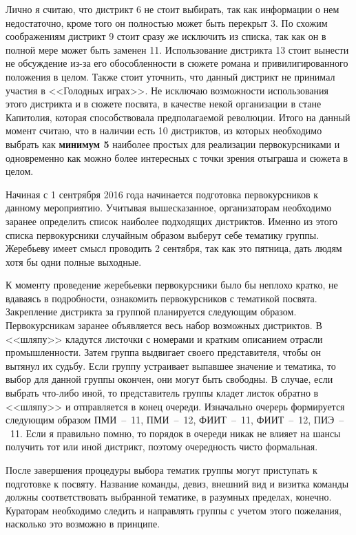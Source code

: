 \documentclass[a4paper, 14pt]{extarticle}
\begin{document}
\par Лично я считаю, что дистрикт 6 не стоит выбирать, так как информации о нем недостаточно, кроме того он полностью может быть перекрыт 3. По схожим соображениям дистрикт 9 стоит сразу же исключить из списка, так как он в полной мере может быть заменен 11. Использование дистрикта 13 стоит вынести не обсуждение из-за его обособленности в сюжете романа и привилигированного положения в целом. Также стоит уточнить, что данный дистрикт не принимал участия в <<Голодных играх>>. Не исключаю возможности использования этого дистрикта и в сюжете посвята, в качестве некой организации в стане Капитолия, которая способствовала предполагаемой революции. Итого на данный момент считаю, что в наличии есть 10 дистриктов, из которых необходимо выбрать как \textbf{минимум 5} наиболее простых для реализации первокурсниками и одновременно как можно более интересных с точки зрения отыграша и сюжета в целом.

\par Начиная с 1 сентрября 2016 года начинается подготовка первокурсников к данному мероприятию. Учитывая вышесказанное, организаторам необходимо заранее определить список наиболее подходящих дистриктов. Именно из этого списка первокурсники случайным образом выберут себе тематику группы. Жеребьеву имеет смысл проводить 2 сентября, так как это пятница, дать людям хотя бы одни полные выходные.

\par К моменту проведение жеребьевки первокурсники было бы неплохо кратко, не вдаваясь в подробности, ознакомить первокурсников с тематикой посвята. Закрепление дистрикта за группой планируется следующим образом. Первокурсникам заранее объявляется весь набор возможных дистриктов. В <<шляпу>> кладутся листочки с номерами и кратким описанием отрасли промышленности. Затем группа выдвигает своего представителя, чтобы он вытянул их судьбу. Если группу устраивает выпавшее значение и тематика, то выбор для данной группы окончен, они могут быть свободны. В случае, если выбрать что-либо иной, то представитель группы кладет листок обратно в <<шляпу>> и отправляется в конец очереди. Изначально очерерь формируется следующим образом ПМИ~--~11, ПМИ~--~12, ФИИТ~--~11, ФИИТ~--~12, ПИЭ~--~11. Если я правильно помню, то порядок в очереди никак не влияет на шансы получить тот или иной дистрикт, поэтому очередность чисто формальная.

\par После завершения процедуры выбора тематик группы могут приступать к подготовке к посвяту. Название команды, девиз, внешний вид и визитка команды должны соответствовать выбранной тематике, в разумных пределах, конечно. Кураторам необходимо следить и направлять группы с учетом этого пожелания, насколько это возможно в принципе.
\end{document}
